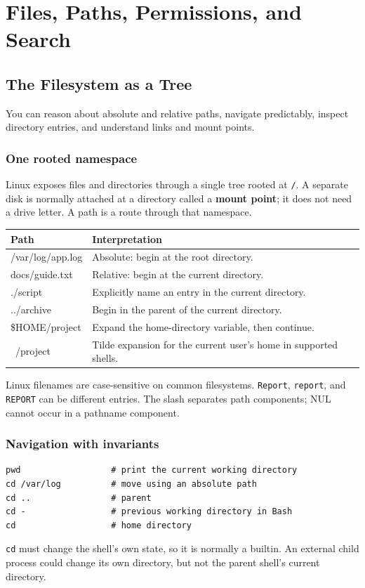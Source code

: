 \documentclass[11pt,oneside,openany]{book}
\newcommand{\term}[1]{\textbf{\color{Navy}#1}}
\newcommand{\chaptergoals}[1]{%
  \begin{tcolorbox}[colback=Paper,colframe=Blue,title={Learning outcomes},fonttitle=\bfseries]
  #1
  \end{tcolorbox}}
\begin{document}
\part{Files, Paths, Permissions, and Search}

\chapter{The Filesystem as a Tree}
\chaptergoals{You can reason about absolute and relative paths, navigate predictably, inspect directory entries, and understand links and mount points.}

\section{One rooted namespace}
Linux exposes files and directories through a single tree rooted at \texttt{/}. A separate disk is normally attached at a directory called a \term{mount point}; it does not need a drive letter. A path is a route through that namespace.

\begin{center}
\begin{tabularx}{0.94\textwidth}{>{\ttfamily}p{}X}
\toprule
Path & Interpretation \\
\midrule
/var/log/app.log & Absolute: begin at the root directory. \\
docs/guide.txt & Relative: begin at the current directory. \\
./script & Explicitly name an entry in the current directory. \\
../archive & Begin in the parent of the current directory. \\
\$HOME/project & Expand the home-directory variable, then continue. \\
~/project & Tilde expansion for the current user's home in supported shells. \\
\bottomrule
\end{tabularx}
\end{center}

Linux filenames are case-sensitive on common filesystems. \texttt{Report}, \texttt{report}, and \texttt{REPORT} can be different entries. The slash separates path components; NUL cannot occur in a pathname component.

\section{Navigation with invariants}
\begin{lstlisting}
pwd                  # print the current working directory
cd /var/log          # move using an absolute path
cd ..                # parent
cd -                 # previous working directory in Bash
cd                   # home directory
\end{lstlisting}
\texttt{cd} must change the shell's own state, so it is normally a builtin. An external child process could change its own directory, but not the parent shell's current directory.
\end{document}
